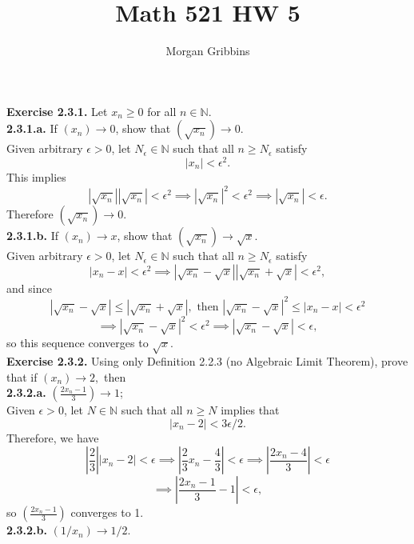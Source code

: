\documentclass[12pt,letterpaper]{article}
\title{Math 521 HW 5}
\author{Morgan Gribbins}
\date{}
\begin{document}
	
\maketitle

\textbf{Exercise 2.3.1.} Let \(x_{n} \geq 0\) for all \(n \in \mathbb{N}\). \\

\textbf{2.3.1.a.} If \((x_{n}) \to 0\), show that \( ( \sqrt{x_{n}} ) \to 0\). \\

Given arbitrary \(\epsilon > 0\), let \(N_{\epsilon} \in \mathbb{N}\) such that all \(n \geq N_{\epsilon}\) satisfy \[|x_{n}| < \epsilon^{2}.\] This implies \[|\sqrt{x_{n}}||\sqrt{x_{n}}| < \epsilon^{2} \implies |\sqrt{x_{n}}|^{2} < \epsilon^{2} \implies  |\sqrt{x_{n}}| < \epsilon.\] Therefore \((\sqrt{x_{n}})\to 0\). \\

\textbf{2.3.1.b.} If \((x_{n}) \to x\), show that \((\sqrt{x_{n}}) \to \sqrt{x}\). \\

Given arbitrary \(\epsilon > 0\), let \(N_{\epsilon} \in \mathbb{N}\) such that all \(n \geq N_{\epsilon}\) satisfy \[|x_{n} - x| < \epsilon^{2} \implies |\sqrt{x_{n}}-\sqrt{x}||\sqrt{x_{n}} + \sqrt{x}| < \epsilon^{2},\] and since \[|\sqrt{x_{n}} - \sqrt{x}| \leq |\sqrt{x_{n}} + \sqrt{x}|, \text{ then } |\sqrt{x_{n}} - \sqrt{x}|^{2} \leq |x_{n} - x| < \epsilon^{2}\] \[\implies |\sqrt{x_{n}} - \sqrt{x}|^{2} < \epsilon^{2} \implies |\sqrt{x_{n}} - \sqrt{x}| < \epsilon,\] so this sequence converges to \(\sqrt{x}\). \\

\textbf{Exercise 2.3.2.} Using only Definition 2.2.3 (no Algebraic Limit Theorem), prove that if \((x_{n}) \to 2, \) then \\

\textbf{2.3.2.a.} \((\frac{2x_{n}-1}{3}) \to 1\); \\

Given \(\epsilon > 0\), let \(N \in \mathbb{N}\) such that all \(n \geq N\) implies that \[|x_{n} - 2| < 3\epsilon/2.\] Therefore, we have \[  \left|\frac{2}{3}\right||x_{n} - 2| < \epsilon \implies \left|\frac{2}{3}x_{n} - \frac{4}{3}\right| < \epsilon \implies \left|\frac{2x_{n}-4}{3}\right| < \epsilon\] \[\implies \left|\frac{2x_{n}-1}{3} -1\right| < \epsilon,\] so \(\left(\frac{2x_{n}-1}{3} \right)\) converges to 1. \\

\textbf{2.3.2.b.} \((1/x_{n}) \to 1/2\). \\
\end{document}
